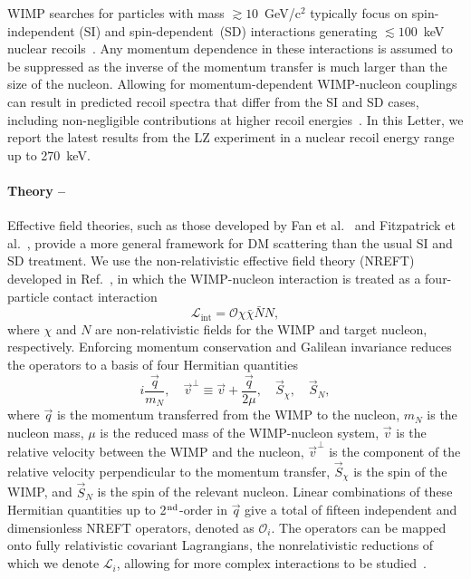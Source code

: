 WIMP searches for particles with mass  $\gtrsim10$~GeV/c$^2$ typically focus on spin-independent (SI) and spin-dependent~(SD) interactions generating $\lesssim100$~keV nuclear recoils~\cite{Lewin:1995rx, Goodman:1984dc, Griest:1988ma}.
Any momentum dependence in these interactions is assumed to be suppressed as the inverse of the momentum transfer is much larger than the size of the nucleon. 
Allowing for momentum-dependent WIMP-nucleon couplings can result in predicted recoil spectra that differ from the SI and SD cases, including non-negligible contributions at higher recoil energies~\cite{Chang:2009yt,Feldstein:2009tr}. 
In this Letter, we report the latest results from the LZ experiment in a nuclear recoil energy range up to 270~keV.

\paragraph{Theory --\label{sec:theory}}
Effective field theories, such as those developed by Fan et al.~\cite{Fan_2010} and Fitzpatrick et al.~\cite{Fitzpatrick:EFT}, provide a more general framework for DM scattering than the usual SI and SD treatment.
We use the non-relativistic effective field theory (NREFT) developed in Ref.~\cite{Fitzpatrick:EFT}, in which the WIMP-nucleon interaction is treated as a four-particle contact interaction
\begin{equation}
    \mathcal{L}_\text{int} = \mathcal{O}\chi\bar{\chi}\bar{N}N,
\end{equation}
where $\chi$ and $N$ are non-relativistic fields for the WIMP and target nucleon, respectively.
Enforcing momentum conservation and Galilean invariance \cite{Fitzpatrick:EFT}  reduces the operators to a basis of four Hermitian quantities
\begin{equation}
i \frac{\vec{q}}{m_N}, \quad \vec{v}^\perp \equiv \vec{v} + \frac{\vec{q}}{2\mu}, \quad \vec{S}_{\chi}, \quad \vec{S}_{N},
\label{eq:basis}
\end{equation}
where $\vec{q}$ is the momentum transferred from the WIMP to the nucleon, $m_N$ is the nucleon mass, $\mu$ is the reduced mass of the WIMP-nucleon system, $\vec{v}$ is the relative velocity between the WIMP and the nucleon, $\vec{v}^\perp$ is the component of the relative velocity  perpendicular to the momentum transfer, $\vec{S}_{\chi}$ is the spin of the WIMP, and $\vec{S}_{N}$ is the spin of the relevant nucleon. 
Linear combinations of these Hermitian quantities up to 2$^{\rm nd}$-order in $\vec{q}$ give a total of fifteen independent and dimensionless NREFT operators, denoted as $\mathcal{O}_i$. The operators can be mapped onto fully relativistic covariant Lagrangians, the nonrelativistic reductions of which we denote $\mathcal{L}_i$, allowing for more complex interactions to be studied~\cite{PandaX:2023_dm_luminescence,LZ:SR1_NREFT_Lagrangian_2024,Anand:MathematicaEFT}.
